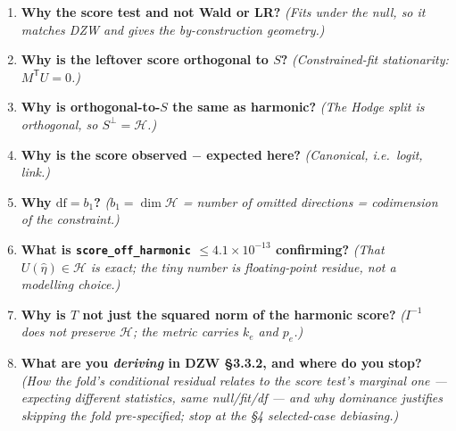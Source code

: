 \documentclass[11pt,a4paper]{article}
\newcommand{\Hh}{\mathcal{H}}
\newcommand{\Tr}{{\mathsf T}}
\theoremstyle{definition}
\begin{document}
\begin{enumerate}[leftmargin=1.6em,itemsep=0.35em]
\item \textbf{Why the score test and not Wald or LR?}
  \emph{(Fits under the null, so it matches DZW and gives the by-construction
  geometry.)}
\item \textbf{Why is the leftover score orthogonal to $S$?}
  \emph{(Constrained-fit stationarity: $M^{\Tr}U=0$.)}
\item \textbf{Why is orthogonal-to-$S$ the same as harmonic?}
  \emph{(The Hodge split is orthogonal, so $S^{\perp}=\Hh$.)}
\item \textbf{Why is the score observed $-$ expected here?}
  \emph{(Canonical, i.e.\ logit, link.)}
\item \textbf{Why $\mathrm{df}=b_1$?}
  \emph{($b_1=\dim\Hh$ = number of omitted directions = codimension of the
  constraint.)}
\item \textbf{What is \texttt{score\_off\_harmonic} $\le 4.1\times10^{-13}$
  confirming?} \emph{(That $U(\hat\eta)\in\Hh$ is exact; the tiny number is
  floating-point residue, not a modelling choice.)}
\item \textbf{Why is $T$ not just the squared norm of the harmonic score?}
  \emph{($I^{-1}$ does not preserve $\Hh$; the metric carries $k_e$ and $p_e$.)}
\item \textbf{What are you \emph{deriving} in DZW \S3.3.2, and where do you
  stop?} \emph{(How the fold's conditional residual relates to the score test's
  marginal one --- expecting different statistics, same null/fit/df --- and why
  dominance justifies skipping the fold pre-specified; stop at the \S4
  selected-case debiasing.)}
\end{enumerate}
\end{document}
